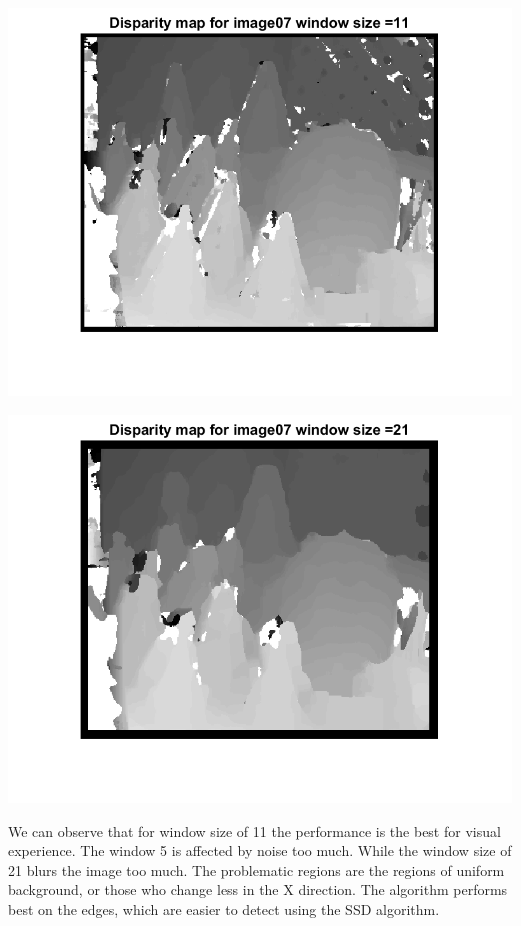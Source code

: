 \documentclass[a4paper]{iacas}
\begin{document}
\begin{minipage}{\linewidth}
	\includegraphics[scale=1]{results/04_16_06/disp_map_07_template_2.png}
	\label{fig_4}
\end{minipage}
\vskip 0.1in
\begin{minipage}{\linewidth}
	\includegraphics[scale=1]{results/04_16_06/disp_map_07_template_3.png}
	\label{fig_4}
\end{minipage}
\vskip 0.1in


We can observe that for window size of 11 the performance is the best for visual experience. The window 5 is affected by noise too much. While the window size of 21 blurs the image too much. The problematic regions are the regions of uniform background, or those who change less in the X direction. The algorithm performs best on the edges, which are easier to detect using the SSD algorithm.
\end{document}
